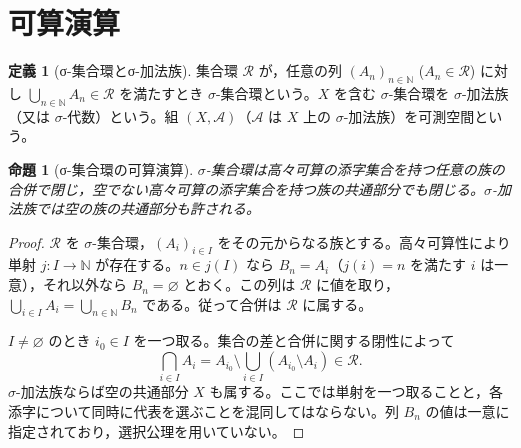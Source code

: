 \documentclass[a5paper,10pt,dvipdfmx]{jsarticle}
\theoremstyle{definition}
\newtheorem{defn}[ruledef]{定義}
\theoremstyle{plain}
\newtheorem{prop}[ruledef]{命題}
\begin{document}
\section{可算演算}
\begin{defn}[σ-集合環とσ-加法族]\label{k182}
集合環 $\mathcal R$ が，任意の列 $(A_n)_{n\in\mathbb N}$ ($A_n\in\mathcal R$) に対し $\bigcup_{n\in\mathbb N}A_n\in\mathcal R$ を満たすとき $\sigma$-集合環という。$X$ を含む $\sigma$-集合環を $\sigma$-加法族（又は $\sigma$-代数）という。組 $(X,\mathcal A)$（$\mathcal A$ は $X$ 上の $\sigma$-加法族）を可測空間という。
\end{defn}
\begin{prop}[σ-集合環の可算演算]\label{k183}
$\sigma$-集合環は高々可算の添字集合を持つ任意の族の合併で閉じ，空でない高々可算の添字集合を持つ族の共通部分でも閉じる。$\sigma$-加法族では空の族の共通部分も許される。
\end{prop}
\begin{proof}
$\mathcal R$ を $\sigma$-集合環，$(A_i)_{i\in I}$ をその元からなる族とする。高々可算性により単射 $j\colon I\to\mathbb N$ が存在する。$n\in j(I)$ なら $B_n=A_i$（$j(i)=n$ を満たす $i$ は一意），それ以外なら $B_n=\varnothing$ とおく。この列は $\mathcal R$ に値を取り，$\bigcup_{i\in I}A_i=\bigcup_{n\in\mathbb N}B_n$ である。従って合併は $\mathcal R$ に属する。

$I\ne\varnothing$ のとき $i_0\in I$ を一つ取る。集合の差と合併に関する閉性によって
\[\bigcap_{i\in I}A_i=A_{i_0}\setminus\bigcup_{i\in I}(A_{i_0}\setminus A_i)\in\mathcal R.\]
$\sigma$-加法族ならば空の共通部分 $X$ も属する。ここでは単射を一つ取ることと，各添字について同時に代表を選ぶことを混同してはならない。列 $B_n$ の値は一意に指定されており，選択公理を用いていない。
\end{proof}
\end{document}
